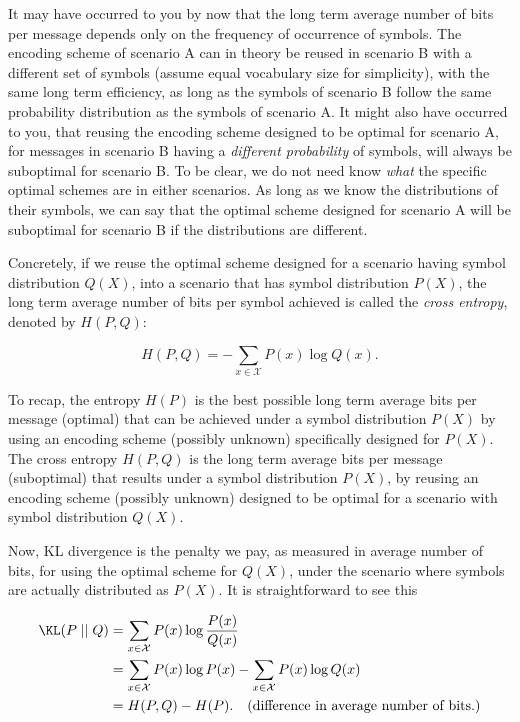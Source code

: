 It may have occurred to you by now that the long term average number of bits per message depends only
on the frequency of occurrence of symbols. The encoding scheme of scenario A can in theory be
reused in scenario B with a different set of symbols (assume equal vocabulary size for simplicity),
with the same long term efficiency, as long as the symbols of scenario B follow the same probability
distribution as the symbols of scenario A. It might also have occurred to you, that reusing the encoding scheme
designed to be optimal for scenario A, for messages in scenario B having a \emph{different probability} of symbols, will always
be suboptimal for scenario B. To be clear, we do not need know \emph{what} the specific optimal
schemes are in either scenarios. As long as we know the distributions of their symbols,
we can say that the optimal scheme designed for scenario A will be suboptimal for scenario B if the
distributions are different.

Concretely, if we reuse the optimal scheme designed for a scenario having symbol distribution $Q(X)$,
into a scenario that has symbol distribution $P(X)$, the long term average
number of bits per symbol achieved is called the \emph{cross entropy}, denoted by $H(P, Q)$:

$$H(P, Q) = -\sum_{x \in \mathcal{X}} P(x) \log Q(x). $$

To recap, the entropy $H(P)$ is the best possible long term average bits per message (optimal) that
can be achieved under a symbol distribution $P(X)$ by using an encoding scheme (possibly unknown)
specifically designed for $P(X)$. The cross entropy $H(P, Q)$ is the long term average bits per
message (suboptimal) that results under a symbol distribution $P(X)$, by reusing an encoding
scheme (possibly unknown) designed to be optimal for a scenario with symbol distribution $Q(X)$.

Now, KL divergence is the penalty we pay, as measured in average number of bits, for using the
optimal scheme for $Q(X)$, under the scenario where symbols are actually distributed as $P(X)$. It is
straightforward to see this

\begin{align*}
\KL(P \mid \mid Q) &= \sum_{x \in \mathcal{X}} P(x) \log\frac{P(x)}{Q(x)} \\
&= \sum_{x \in \mathcal{X}} P(x) \log P(x) - \sum_{x\in \mathcal{X}}P(x) \log Q(x) \\
&= H(P, Q) - H(P). \quad \text{(difference in average number of bits.)}
\end{align*}

